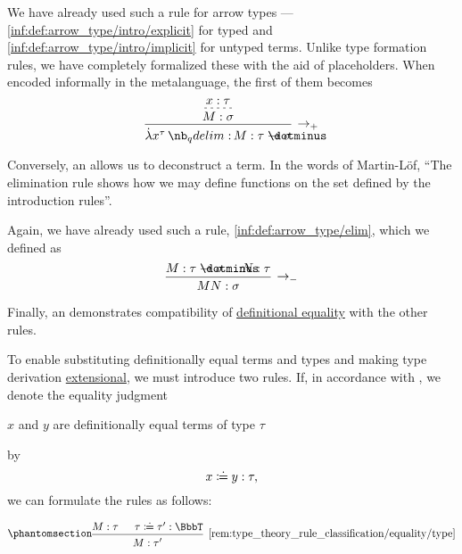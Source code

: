 \begin{remark}
\begin{thmenum}
    We have already used such a rule for arrow types --- \ref{inf:def:arrow_type/intro/explicit} for typed and \ref{inf:def:arrow_type/intro/implicit} for untyped terms. Unlike type formation rules, we have completely formalized these with the aid of placeholders. When encoded informally in the metalanguage, the first of them becomes
    \begin{equation*}
      \begin{prooftree}
        \hypo{ x: \tau }
        \infer[dashed]1{ M: \sigma }
        \infer1[\ensuremath{ \rightarrow_+ }]{ \qabs {x^{\tau}} M: \tau \synimplies \sigma }
      \end{prooftree}
    \end{equation*}

     Conversely, an  allows us to deconstruct a term. In the words of Martin-L\"of, \enquote{The elimination rule shows how we may define functions on the set defined by the introduction rules}.

    Again, we have already used such a rule, \ref{inf:def:arrow_type/elim}, which we defined as
    \begin{equation*}
      \begin{prooftree}
        \hypo{ M: \tau \synimplies \sigma }
        \hypo{ N: \tau }
        \infer2[\ensuremath{ \rightarrow_- }]{ M N: \sigma }
      \end{prooftree}
    \end{equation*}

     Finally, an  demonstrates compatibility of \hyperref[con:equality]{definitional equality} with the other rules.

    To enable substituting definitionally equal terms and types and making type derivation \hyperref[con:extensionality]{extensional}, we must introduce two rules. If, in accordance with , we denote the equality judgment
    \begin{center}
      \( x \) and \( y \) are definitionally equal terms of type \( \tau \)
    \end{center}
    by
    \begin{equation*}
      x \syndefeq y: \tau,
    \end{equation*}
    we can formulate the rules as follows:
    \begin{paracol}{2}
      \begin{leftcolumn}
        \ParacolAlignmentHack
        \begin{equation*}\taglabel[\ensuremath{ \coloneqq_{\logic{type}} }]{rem:type_theory_rule_classification/equality/type}
          \begin{prooftree}
            \hypo{ M: \tau }
            \hypo{ \tau \syndefeq \tau': \BbbT }
            \infer2[\ref{rem:type_theory_rule_classification/equality/type}]{ M: \tau' }
          \end{prooftree}
        \end{equation*}
      \end{leftcolumn}


\end{paracol}
\end{thmenum}
\end{remark}
